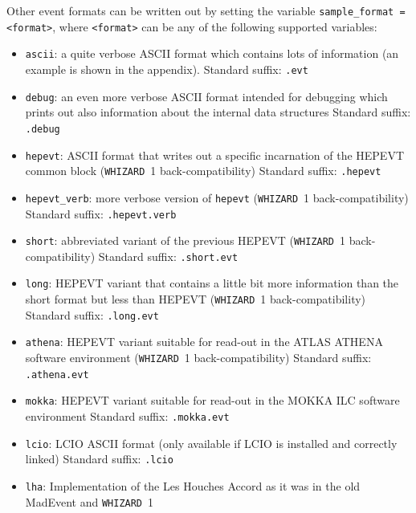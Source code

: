 \documentclass[12pt]{book}
\newcommand{\ttt}[1]{\texttt{#1}}
\newcommand{\whizard}{\ttt{WHIZARD}}
\begin{document}
Other event formats can be written out by setting the variable
\ttt{sample\_format = <format>}, where \ttt{<format>} can be any of
the following supported variables:
\begin{itemize}
\item \ttt{ascii}: a quite verbose ASCII format which contains lots of
  information (an example is shown in the appendix). \newline
  Standard suffix: \ttt{.evt}
\item \ttt{debug}: an even more verbose ASCII format intended for
  debugging which prints out also information about the internal data
  structures \newline
  Standard suffix: \ttt{.debug}
\item \ttt{hepevt}: ASCII format that writes out a specific
  incarnation of the HEPEVT common block (\whizard~1
  back-compatibility) \newline
  Standard suffix: \ttt{.hepevt}
\item \ttt{hepevt\_verb}: more verbose version of \ttt{hepevt} (\whizard~1
  back-compatibility) \newline
  Standard suffix: \ttt{.hepevt.verb}
\item \ttt{short}: abbreviated variant of the previous HEPEVT (\whizard\
  1 back-compatibility)  \newline
  Standard suffix: \ttt{.short.evt}
\item \ttt{long}: HEPEVT variant that contains a little bit more
  information than the short format but less than HEPEVT (\whizard\
  1 back-compatibility)  \newline
  Standard suffix: \ttt{.long.evt}
\item \ttt{athena}: HEPEVT variant suitable for read-out in the ATLAS
  ATHENA software environment (\whizard\
  1 back-compatibility)  \newline
  Standard suffix: \ttt{.athena.evt}
\item \ttt{mokka}: HEPEVT variant suitable for read-out in the MOKKA
  ILC software environment \newline
  Standard suffix: \ttt{.mokka.evt}
\item \ttt{lcio}: LCIO ASCII format (only available if LCIO is
  installed and correctly linked) \newline
  Standard suffix: \ttt{.lcio}
\item \ttt{lha}: Implementation of the Les Houches Accord as it was in
  the old MadEvent and \whizard~1 \newline

\end{itemize}
\end{document}
